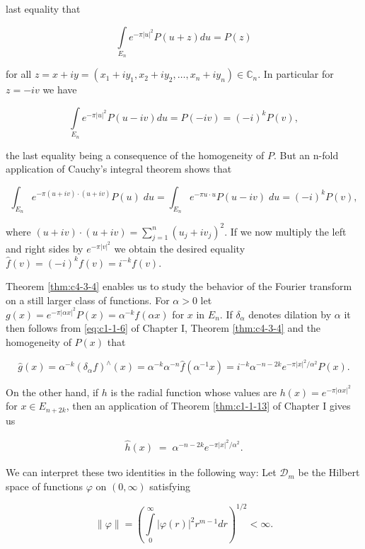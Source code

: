 last equality that

\[
\int\limits_{E_{n}}e^{-\pi|u|^{2}}P(u+z)d u=P(z)
\]

for all $z = x + iy = (x_1 + iy_1, x_2 + iy_2, \ldots, x_n + iy_n) \in \mathbb{C}_n$. In particular for $z = -iv$ we have

\[
\int\limits_{E_{n}}e^{-\pi|u|^{2}}P(u-i v)d u=P(-i v)=(-i)^{k}P(v),
\]

the last equality being a consequence of the homogeneity of $P$. But an n-fold application of Cauchy's integral theorem shows that

\[
\int_{E_{n}}e^{-\pi(u+i v)\cdot(u+i v)}P(u)\;d u=\int_{E_{n}}e^{-\pi u\cdot u}P(u-i v)\;d u=(-i)^{k}P(v),
\]

where $(u + iv) \cdot (u + iv) = \sum_{j=1}^{n} (u_j + iv_j)^2$. If we now multiply the left and right sides by $e^{-\pi|v|^2}$ we obtain the desired equality $\hat{f}(v) = (-i)^k f(v) = i^{-k} f(v)$.

Theorem \ref{thm:c4-3-4} enables us to study the behavior of the Fourier transform on a still larger class of functions. For $\alpha > 0$ let $g(x) = e^{-\pi |\alpha x|^2} P(x) = \alpha^{-k} f(\alpha x)$ for $x$ in $E_n$. If $\delta_\alpha$ denotes dilation by $\alpha$ it then follows from \eqref{eq:c1-1-6} of Chapter I, Theorem \ref{thm:c4-3-4} and the homogeneity of $P(x)$ that

\begin{equation}\label{eq:c4-3-5}
\hat{g}(x)=\alpha^{-k}(\delta_{\alpha}f)^{\wedge}(x)=\alpha^{-k}\alpha^{-n}\hat{f}(\alpha^{-1}x)=i^{-k}\alpha^{-n-2k}e^{-\pi|x|^{2}/\alpha^{2}}P(x).
\end{equation}

On the other hand, if $h$ is the radial function whose values are $h(x) = e^{-\pi |\alpha x|^2}$ for $x \in E_{n+2k}$, then an application of Theorem \ref{thm:c1-1-13} of Chapter I gives us

\begin{equation}\label{eq:c4-3-6}
\begin{array}{r}{\hat{h}(x)\;=\;\alpha^{-n-2k}e^{-\pi|x|^{2}/\alpha^{2}}.}\end{array}
\end{equation}

We can interpret these two identities in the following way: Let $\mathcal{D}_m$ be the Hilbert space of functions $\varphi$ on $(0, \infty)$ satisfying

\[
\|\varphi\|=\left(\int\limits_{0}^{\infty}|\varphi(r)|^{2}r^{m-1}d r\right)^{1/2}<\infty.
\]

